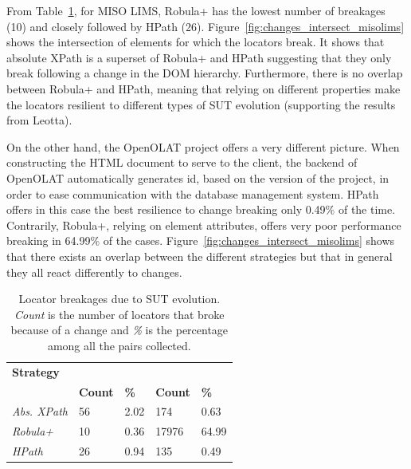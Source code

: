 From Table~\ref{tab:locator_breakage}, for MISO LIMS, Robula+ has the lowest number of breakages (10) and closely followed by HPath (26). Figure~\ref{fig:changes_intersect_misolims} shows the intersection of elements for which the locators break. It shows that absolute XPath is a superset of Robula+ and HPath suggesting that they only break following a change in the DOM hierarchy. Furthermore, there is no overlap between Robula+ and HPath, meaning that relying on different properties make the locators resilient to different types of SUT evolution (supporting the results from Leotta\etal\cite{Leotta2015}).

On the other hand, the OpenOLAT project offers a very different picture. When constructing the HTML document to serve to the client, the backend of OpenOLAT automatically generates id, based on the version of the project, in order to ease communication with the database management system. HPath offers in this case the best resilience to change breaking only 0.49\% of the time. Contrarily, Robula+, relying on element attributes, offers very poor performance breaking in 64.99\% of the cases. Figure~\ref{fig:changes_intersect_misolims} shows that there exists an overlap between the different strategies but that in general they all react differently to changes.

\begin{table}
\centering
\caption{Locator breakages due to SUT evolution. \emph{Count} is the number of locators that broke because of a change and \emph{\%} is the percentage among all the pairs collected.}
\label{tab:locator_breakage}
\begin{tabular}{>{\raggedright}m{0.6in}>{\raggedleft}m{0.4in} >{\raggedleft}m{0.2in}>{\raggedleft}m{0.4in} >{\raggedleft}m{0.2in}}
\toprule
\textbf{\scriptsize{Strategy}} & \multicolumn{2}{c}{\textbf{\scriptsize{MISO LIMS}}} & \multicolumn{2}{c}{\textbf{\scriptsize{OpenOLAT}}}\tabularnewline
    & \textbf{\scriptsize{Count}} & \textbf{\scriptsize{\%}} & \textbf{\scriptsize{Count}} & \textbf{\scriptsize{\%}}\tabularnewline
\toprule
\scriptsize{\textit{Abs. XPath}} & \scriptsize{56} & \scriptsize{2.02} & \scriptsize{174} & \scriptsize{0.63}\tabularnewline
\scriptsize{\textit{Robula+}} & \scriptsize{10} & \scriptsize{0.36} & \scriptsize{17976} & \scriptsize{64.99}\tabularnewline
\scriptsize{\textit{HPath}} & \scriptsize{26} & \scriptsize{0.94} & \scriptsize{135} & \scriptsize{0.49}\tabularnewline
\bottomrule
\end{tabular}
\end{table}

